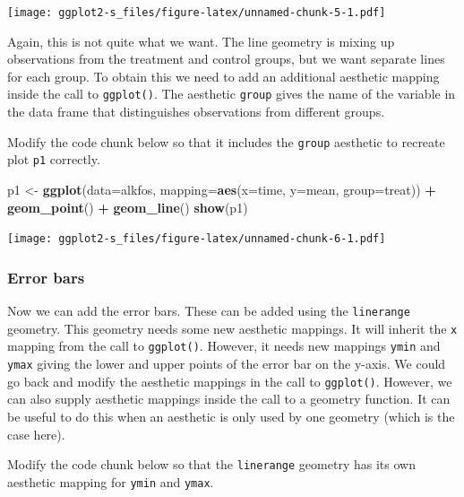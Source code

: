 \documentclass[
]{book}
\newenvironment{Shaded}{\begin{snugshade}}{\end{snugshade}}
\newcommand{\AttributeTok}[1]{\textcolor[rgb]{0.13,0.29,0.53}{#1}}
\newcommand{\FunctionTok}[1]{\textcolor[rgb]{0.13,0.29,0.53}{\textbf{#1}}}
\newcommand{\NormalTok}[1]{#1}
\newcommand{\OtherTok}[1]{\textcolor[rgb]{0.56,0.35,0.01}{#1}}
\newcommand{\SpecialCharTok}[1]{\textcolor[rgb]{0.81,0.36,0.00}{\textbf{#1}}}
\begin{document}
\texttt{[image: ggplot2-s\_files/figure-latex/unnamed-chunk-5-1.pdf]}

Again, this is not quite what we want. The line geometry is mixing up observations from the treatment and control groups, but we want separate lines for each group. To obtain this we need to add an additional aesthetic mapping inside the call to \texttt{ggplot()}. The aesthetic \texttt{group} gives the name of the variable in the data frame that distinguishes observations from different groups.

Modify the code chunk below so that it includes the \texttt{group} aesthetic to recreate plot \texttt{p1} correctly.

\begin{Shaded}
\begin{Highlighting}[]
\NormalTok{p1 }\OtherTok{\textless{}{-}} \FunctionTok{ggplot}\NormalTok{(}\AttributeTok{data=}\NormalTok{alkfos, }\AttributeTok{mapping=}\FunctionTok{aes}\NormalTok{(}\AttributeTok{x=}\NormalTok{time, }\AttributeTok{y=}\NormalTok{mean, }\AttributeTok{group=}\NormalTok{treat)) }\SpecialCharTok{+}
  \FunctionTok{geom\_point}\NormalTok{() }\SpecialCharTok{+} \FunctionTok{geom\_line}\NormalTok{()}
\FunctionTok{show}\NormalTok{(p1)}
\end{Highlighting}
\end{Shaded}

\texttt{[image: ggplot2-s\_files/figure-latex/unnamed-chunk-6-1.pdf]}

\subsubsection{Error bars}\label{error-bars}

Now we can add the error bars. These can be added using the \texttt{linerange} geometry. This geometry needs some new aesthetic mappings. It will inherit the \texttt{x} mapping from the call to \texttt{ggplot()}. However, it needs new mappings \texttt{ymin} and \texttt{ymax} giving the lower and upper points of the error bar on the y-axis. We could go back and modify the aesthetic mappings in the call to \texttt{ggplot()}. However, we can also supply aesthetic mappings inside the call to a geometry function. It can be useful to do this when an aesthetic is only used by one geometry (which is the case here).

Modify the code chunk below so that the \texttt{linerange} geometry has its own aesthetic mapping for \texttt{ymin} and \texttt{ymax}.
\end{document}
